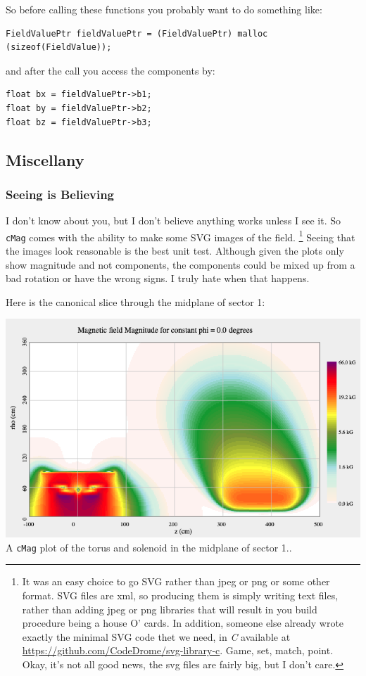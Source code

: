 \documentclass{article}
\begin{document}
So before calling these functions you probably want to do something like:
\begin{verbatim}
FieldValuePtr fieldValuePtr = (FieldValuePtr) malloc (sizeof(FieldValue));
\end{verbatim}
and after the call you access the components by:
\begin{verbatim}
float bx = fieldValuePtr->b1;
float by = fieldValuePtr->b2;
float bz = fieldValuePtr->b3;
\end{verbatim}


\subsection {Miscellany}
\subsubsection{Seeing is Believing}
I don't know about you, but I don't believe anything works unless I see it. So \texttt{cMag} comes with the ability to make some SVG images of the field. \footnote{It was an easy choice to go SVG rather than jpeg or png or some other format.  SVG files are xml, so producing them is simply writing text files, rather than adding jpeg or png libraries that will result in you build procedure being a house O' cards. In addition, someone else already wrote exactly the minimal SVG code thet we need, in \textit{C} available at \url{https://github.com/CodeDrome/svg-library-c}. Game, set, match, point.  Okay, it's not all good news, the svg files are fairly big, but I don't care.} Seeing that the images look reasonable is the best unit test. Although given the plots only show magnitude and not components, the components could be mixed up from a bad rotation or have the wrong signs. I truly hate when that happens. 

Here is the canonical slice through the midplane of sector 1:
\vspace{0.8cm}

\begin{center}
\includegraphics[scale=0.6]{fig2}
\vspace{0.2 cm}
\\A  \texttt{cMag} plot of the torus and solenoid in the midplane of sector 1..
\end{center}
\end{document}
